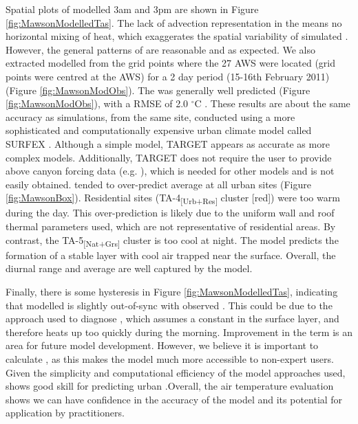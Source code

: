 \documentclass[final,3p,times,authoryear]{elsarticle}
\newcommand{\degreeC}{\ensuremath{^\circ}C }
\newcommand{\subs}{\textsubscript}
\newcommand{\TAfourS}{TA-4\subs{[Urb+Res]} }
\newcommand{\TAfiveS}{TA-5\subs{[Nat+Grs]} }
\begin{document}
Spatial plots of modelled 3am and 3pm  are shown in Figure \ref{fig:MawsonModelledTas}. The lack of advection representation in the   means no horizontal mixing of heat, which exaggerates the spatial variability of simulated . However, the general patterns of  are reasonable and as expected. We also extracted modelled  from the grid points where the 27 AWS were located (grid points were centred at the AWS) for a 2 day period (15-16th February 2011) (Figure \ref{fig:MawsonModObs}). The  was generally well predicted (Figure \ref{fig:MawsonModObs}), with a RMSE of 2.0 \degreeC. These results are about the same accuracy as simulations, from the same site, conducted using a more sophisticated and computationally expensive urban climate model called SURFEX \citep{Broadbent}.   Although a simple model, TARGET appears as accurate as more complex models. Additionally, TARGET does not require the user to provide  above canyon forcing data (e.g. ), which is needed for other  models and is  not easily obtained.    tended  to over-predict average  at all urban sites (Figure \ref{fig:MawsonBox}).  Residential sites (\TAfourS cluster [red]) were  too warm during the day. This over-prediction is likely due to the uniform wall and roof thermal parameters used, which are not representative of residential areas. By contrast, the \TAfiveS cluster is too cool at night. The model predicts the formation of a stable layer with cool air trapped near the surface. Overall, the diurnal range and average  are well captured by the model. 

Finally, there is some hysteresis in Figure \ref{fig:MawsonModelledTas}, indicating that modelled  is slightly out-of-sync with observed . This could be due to the approach used to  diagnose , which assumes a constant  in the surface layer, and therefore heats up too quickly during the morning. Improvement in the   term is  an area for future model development. However, we believe it is important to calculate , as this makes the model much more accessible to non-expert users. Given the simplicity and computational efficiency of the model approaches used,  shows good skill for predicting urban .Overall, the air temperature evaluation shows we can have confidence in the accuracy of the model and its potential for application by practitioners. 
\end{document}
